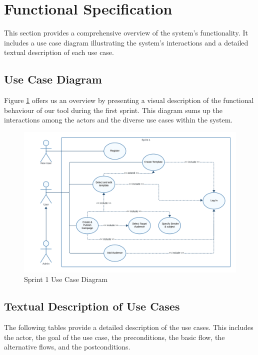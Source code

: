 
\section{Functional Specification}

This section provides a comprehensive overview of the system's functionality. It includes a use case diagram illustrating the system's interactions and a detailed textual description of each use case.

\subsection{Use Case Diagram}

Figure \ref{fig:Sprint 1 Use Case Diagram} offers us an overview by presenting a visual description of the functional
behaviour of our tool during the first sprint. This diagram sums up the interactions among the actors and the
diverse use cases within the system.

\begin{figure}[ht]
	\centering
	\includegraphics[width=\linewidth]{Images/Sprint1/use_case_diag_sprint_1.png}
	\caption{Sprint 1 Use Case Diagram}
	\label{fig:Sprint 1 Use Case Diagram}
\end{figure}

\subsection{Textual Description of Use Cases}

The following tables provide a detailed description of the use cases. This includes the actor, the goal of the use case, the preconditions, the basic flow, the alternative flows, and the postconditions.

